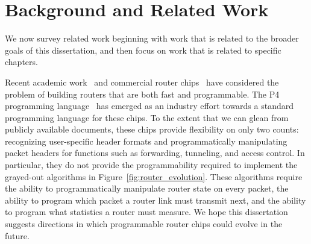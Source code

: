 







\chapter{Background and Related Work}
\label{chap:related}

We now survey related work beginning with work that is related to the broader
goals of this dissertation, and then focus on work that is related to specific
chapters.

Recent academic work~\cite{rmt} and commercial router chips~\cite{tofino,
flexpipe, xpliant} have considered the problem of building routers that are
both fast and programmable. The P4 programming language~\cite{p4} has emerged
as an industry effort towards a standard programming language for these chips.
To the extent that we can glean from publicly available documents, these chips
provide flexibility on only two counts: recognizing user-specific header
formats and programmatically manipulating packet headers for functions such as
forwarding, tunneling, and access control. In particular, they do not provide
the programmability required to implement the grayed-out algorithms in
Figure~\ref{fig:router_evolution}.  These algorithms require the ability to
programmatically manipulate router state on every packet, the ability to
program which packet a router link must transmit next, and the ability to
program what statistics a router must measure. We hope this
dissertation suggests directions in which programmable router
 chips could evolve in the future.


